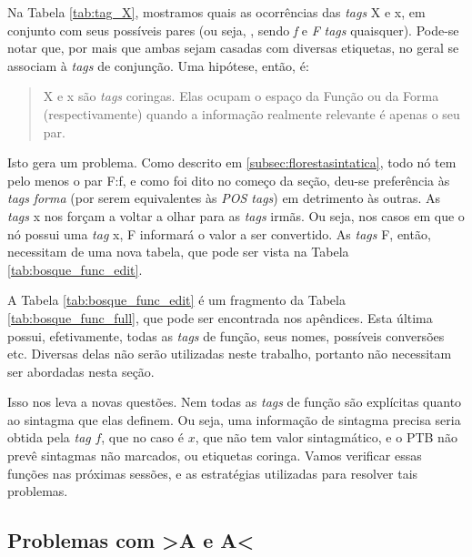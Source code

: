 Na Tabela \ref{tab:tag_X}, mostramos quais as ocorrências das \textit{tags} X e x, em conjunto com seus possíveis pares (ou seja, , sendo \textit{f} e \textit{F} \textit{tags} quaisquer). Pode-se notar que, por mais que ambas sejam casadas com diversas etiquetas, no geral se associam à \textit{tags} de conjunção. Uma hipótese, então, é:
\begin{quote}
	X e x são \textit{tags} coringas. Elas ocupam o espaço da Função ou da Forma (respectivamente) quando a informação realmente relevante é apenas o seu par. 
\end{quote}

Isto gera um problema. Como descrito em \ref{subsec:florestasintatica}, todo nó tem pelo menos o par F:f, e como foi dito no começo da seção, deu-se preferência às \textit{tags} \textit{forma} (por serem equivalentes às \textit{POS tags}) em detrimento às outras. As \textit{tags} x nos forçam a voltar a olhar para as \textit{tags} irmãs. Ou seja, nos casos em que o nó possui uma \textit{tag} x, F informará o valor a ser convertido. As \textit{tags} F, então, necessitam de uma nova tabela, que pode ser vista na Tabela \ref{tab:bosque_func_edit}.
\begin{center}
    
\end{center}

A Tabela \ref{tab:bosque_func_edit} é um fragmento da Tabela \ref{tab:bosque_func_full}, que pode ser encontrada nos apêndices. Esta última possui, efetivamente, todas as \textit{tags} de função, seus nomes, possíveis conversões etc. Diversas delas não serão utilizadas neste trabalho, portanto não necessitam ser abordadas nesta seção.

Isso nos leva a novas questões. Nem todas as \textit{tags} de função são explícitas quanto ao sintagma que elas definem. Ou seja, uma informação de sintagma precisa seria obtida pela \textit{tag} $f$, que no caso é $x$, que não tem valor sintagmático, e o PTB não prevê sintagmas não marcados, ou etiquetas coringa. Vamos verificar essas funções nas próximas sessões, e as estratégias utilizadas para resolver tais problemas.

\subsection{Problemas com >A e A<}
\label{subsec:bosque_a}


